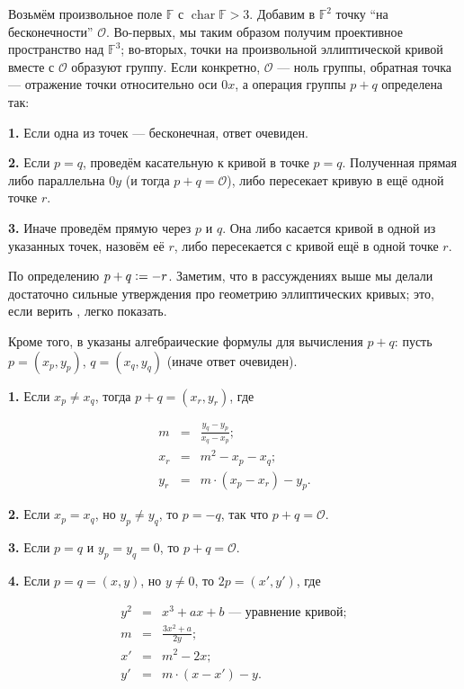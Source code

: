 \documentclass[a4paper,14pt]{extarticle}
\DeclareMathOperator{\chr}{char}
\begin{document}
Возьмём произвольное поле $\mathbb{F}$ с $\chr \mathbb{F} > 3$. Добавим в
$\mathbb{F}^2$ точку ``на бесконечности'' $\mathcal{O}$. Во-первых, мы таким
образом получим проективное пространство над $\mathbb{F}^3$; во-вторых, точки на
произвольной эллиптической кривой вместе с $\mathcal{O}$ образуют группу. Если
конкретно, $\mathcal{O}$ --- ноль группы, обратная точка --- отражение точки
относительно оси $0x$, а операция группы $p + q$ определена так:

\vspace{0.2cm}

\textbf{1.} Если одна из точек --- бесконечная, ответ очевиден.

\textbf{2.} Если $p = q$, проведём касательную к кривой в точке $p = q$.
Полученная прямая либо параллельна $0y$ (и тогда $p + q = \mathcal{O}$),
либо пересекает кривую в ещё одной точке $r$.

\textbf{3.} Иначе проведём прямую через $p$ и $q$. Она либо касается кривой в
одной из указанных точек, назовём её $r$, либо пересекается с кривой ещё
в одной точке $r$.

\vspace{0.2cm}

По определению $p + q \vcentcolon= -r$. Заметим, что в рассуждениях выше мы
делали достаточно сильные утверждения про геометрию эллиптических кривых; это,
если верить \cite{textbook}, легко показать.

Кроме того, в \cite{textbook} указаны алгебраические формулы для вычисления
$p + q$: пусть $p = (x_p, y_p)$, $q = (x_q, y_q)$ (иначе ответ очевиден).

\vspace{0.2cm}

\textbf{1.} Если $x_p \ne x_q$, тогда $p + q = (x_r, y_r)$, где

\[
    \begin{array}{rcl}
        m &=& \frac{y_q - y_p}{x_q - x_p}; \\
        x_r &=& m^2 - x_p - x_q; \\
        y_r &=& m \cdot (x_p - x_r) - y_p.
    \end{array}
\]

\textbf{2.} Если $x_p = x_q$, но $y_p \ne y_q$, то $p = -q$, так что
$p + q = \mathcal{O}$.

\textbf{3.} Если $p = q$ и $y_p = y_q = 0$, то $p + q = \mathcal{O}$.

\textbf{4.} Если $p = q = (x, y)$, но $y \ne 0$, то $2 p = (x', y')$, где

\[
    \begin{array}{rcl}
        y^2 &=& x^3 + a x + b \text{ --- уравнение кривой}; \\
        m &=& \frac{3 x^2 + a}{2 y}; \\
        x' &=& m^2 - 2 x; \\
        y' &=& m \cdot (x - x') - y.
    \end{array}
\]
\end{document}
